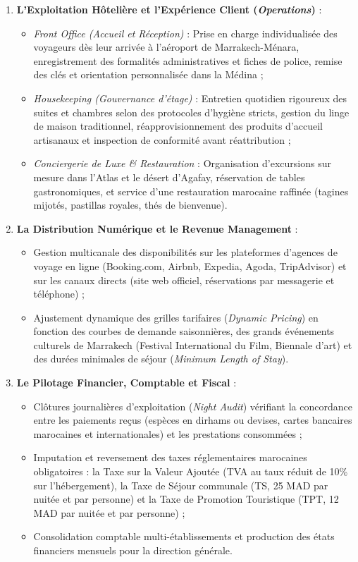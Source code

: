 \begin{enumerate}
    \item \textbf{L'Exploitation Hôtelière et l'Expérience Client (\textit{Operations})} :
    \begin{itemize}
        \item \textit{Front Office (Accueil et Réception)} : Prise en charge individualisée des voyageurs dès leur arrivée à l'aéroport de Marrakech-Ménara, enregistrement des formalités administratives et fiches de police, remise des clés et orientation personnalisée dans la Médina ;
        \item \textit{Housekeeping (Gouvernance d'étage)} : Entretien quotidien rigoureux des suites et chambres selon des protocoles d'hygiène stricts, gestion du linge de maison traditionnel, réapprovisionnement des produits d'accueil artisanaux et inspection de conformité avant réattribution ;
        \item \textit{Conciergerie de Luxe \& Restauration} : Organisation d'excursions sur mesure dans l'Atlas et le désert d'Agafay, réservation de tables gastronomiques, et service d'une restauration marocaine raffinée (tagines mijotés, pastillas royales, thés de bienvenue).
    \end{itemize}
    \item \textbf{La Distribution Numérique et le Revenue Management} :
    \begin{itemize}
        \item Gestion multicanale des disponibilités sur les plateformes d'agences de voyage en ligne (Booking.com, Airbnb, Expedia, Agoda, TripAdvisor) et sur les canaux directs (site web officiel, réservations par messagerie et téléphone) ;
        \item Ajustement dynamique des grilles tarifaires (\textit{Dynamic Pricing}) en fonction des courbes de demande saisonnières, des grands événements culturels de Marrakech (Festival International du Film, Biennale d'art) et des durées minimales de séjour (\textit{Minimum Length of Stay}).
    \end{itemize}
    \item \textbf{Le Pilotage Financier, Comptable et Fiscal} :
    \begin{itemize}
        \item Clôtures journalières d'exploitation (\textit{Night Audit}) vérifiant la concordance entre les paiements reçus (espèces en dirhams ou devises, cartes bancaires marocaines et internationales) et les prestations consommées ;
        \item Imputation et reversement des taxes réglementaires marocaines obligatoires : la Taxe sur la Valeur Ajoutée (TVA au taux réduit de 10\% sur l'hébergement), la Taxe de Séjour communale (TS, 25 MAD par nuitée et par personne) et la Taxe de Promotion Touristique (TPT, 12 MAD par nuitée et par personne) ;
        \item Consolidation comptable multi-établissements et production des états financiers mensuels pour la direction générale.
    \end{itemize}
\end{enumerate}

